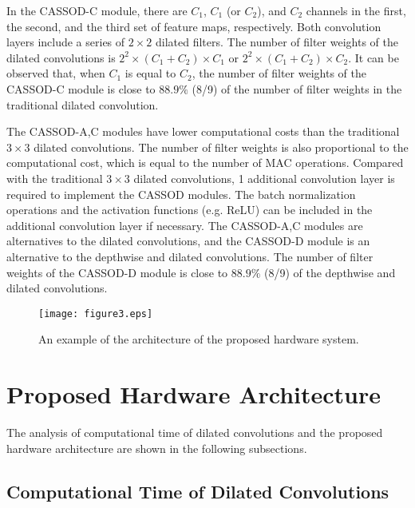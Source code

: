 \documentclass[10pt,twocolumn,letterpaper]{article}
\begin{document}
In the CASSOD-C module, there are $C_{1}$, $C_{1}$ (or $C_{2}$), and $C_{2}$ channels in the first, the second, and the third set of feature maps, respectively. Both convolution layers include a series of $2 \times 2$ dilated filters. The number of filter weights of the dilated convolutions is $2^{2} \times (C_{1} + C_{2}) \times C_{1}$ or $2^{2} \times (C_{1} + C_{2}) \times C_{2}$. It can be observed that, when $C_{1}$ is equal to $C_{2}$, the number of filter weights of the CASSOD-C module is close to $88.9\%$ (8/9) of the number of filter weights in the traditional dilated convolution.

The CASSOD-A,C modules have lower computational costs than the traditional $3 \times 3$ dilated convolutions. The number of filter weights is also proportional to the computational cost, which is equal to the number of MAC operations. Compared with the traditional $3 \times 3$ dilated convolutions, 1 additional convolution layer is required to implement the CASSOD modules. The batch normalization operations and the activation functions (e.g. ReLU) can be included in the additional convolution layer if necessary. The CASSOD-A,C modules are alternatives to the dilated convolutions, and the CASSOD-D module is an alternative to the depthwise and dilated convolutions. The number of filter weights of the CASSOD-D module is close to $88.9\%$ (8/9) of the depthwise and dilated convolutions.



\begin{figure}[t]
\begin{center}
   \texttt{[image: figure3.eps]}\\
\end{center}
   \caption{An example of the architecture of the proposed hardware system.}
\label{fig:system}
\end{figure}

\section{Proposed Hardware Architecture}
\label{sec:architecture}

The analysis of computational time of dilated convolutions and the proposed hardware architecture are shown in the following subsections.


\subsection{Computational Time of Dilated Convolutions}
\label{subsec:time}
\end{document}
